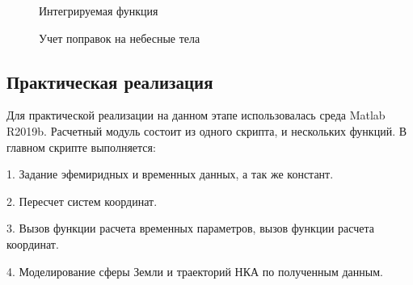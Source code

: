 \documentclass[]{article}
\begin{document}
	
	\begin{figure}[h!]
		
		\caption{Интегрируемая функция }
		\label{3}
	\end{figure}
	
	\begin{figure}[h!]
		
		\caption{Учет поправок на небесные тела }
		\label{4}
	\end{figure}
	
	\subsection{Практическая реализация}
	
	Для практической реализации на данном этапе использовалась среда Matlab R2019b. Расчетный модуль состоит из одного скрипта, и нескольких функций. 
	В главном скрипте выполняется:
	
	1. Задание эфемиридных и временных данных, а так же констант.
	
	2. Пересчет систем координат.
	
	3. Вызов функции расчета временных параметров, вызов функции расчета координат.
	
	4. Моделирование сферы Земли и траекторий НКА по полученным данным.
	
\end{document}
